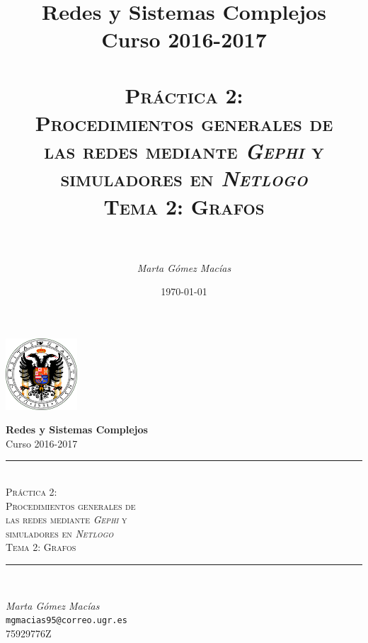 \documentclass[10pt,a4paper,spanish]{article}
\title{
\normalfont \normalsize 
{\bf Redes y Sistemas Complejos} \\ Curso 2016-2017 \\ [25pt] %
\horrule{0.5pt} \\[0.4cm] %
\huge \textsc{Práctica 2: \\ Procedimientos generales de \\ las redes mediante \textit{Gephi} y \\ simuladores en \textit{Netlogo} \\ Tema 2: Grafos} \\ %
\horrule{2pt} \\[0.5cm] %
}
\author{\textit{Marta Gómez Macías}} %
\numberwithin{equation}{section} %
\numberwithin{figure}{section} %
\numberwithin{table}{section} %
\theoremstyle{plain}
\theoremstyle{definition}
\newcommand{\horrule}[1]{\rule{\linewidth}{#1}} %
\begin{document}
\renewcommand{\listtablename}{Índice de tablas}
\renewcommand{\tablename}{Tabla}

\begin{titlepage}
\begin{center}
\includegraphics[width=0.2\textwidth]{../../ugr}

\normalfont \normalsize 
{\bf Redes y Sistemas Complejos} \\ Curso 2016-2017 \\ [25pt] %
\horrule{0.5pt} \\[0.4cm] %
{\huge \textsc{Práctica 2: \\ Procedimientos generales de \\ las redes mediante \textit{Gephi} y \\ simuladores en \textit{Netlogo} \\[0.5cm] Tema 2: Grafos}} %
\horrule{2pt} \\[0.8cm] %

{\Large \textit{Marta Gómez Macías} \\ \texttt{mgmacias95@correo.ugr.es} \\ 75929776Z \\[0.5cm]

\date{\today}} %
\end{center}
\end{titlepage}

\tableofcontents %
\end{document}
